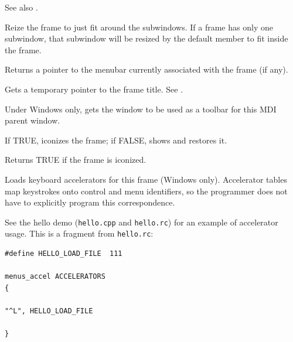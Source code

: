See also .



Reize the frame to just fit around the subwindows. If a frame has only
one subwindow, that subwindow will be resized by the default \rtfsp
member to fit inside the frame.

\label{wxframegetmenubar}


Returns a pointer to the menubar currently associated with the frame (if any).

\label{wxframegettitle}


Gets a temporary pointer to the frame title. See
.

\label{wxframegettoolbar}


Under Windows only, gets the window to be used as a toolbar for this
MDI parent window. 



If TRUE, iconizes the frame; if FALSE, shows and restores it.



Returns TRUE if the frame is iconized.



Loads keyboard accelerators for this frame (Windows only). Accelerator
tables map keystrokes onto control and menu identifiers, so the
programmer does not have to explicitly program this correspondence.

See the hello demo ({\tt hello.cpp} and {\tt hello.rc}) for
an example of accelerator usage. This is a fragment from {\tt hello.rc}:

\begin{verbatim}
#define HELLO_LOAD_FILE  111

menus_accel ACCELERATORS
{

"^L", HELLO_LOAD_FILE

}
\end{verbatim}


